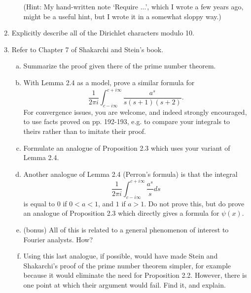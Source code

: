 \documentclass[12pt]{amsart}
\begin{document}
\begin{enumerate}[1.]
\begin{enumerate}[(a)]
(Hint: My hand-written note `Require ...', which I wrote a few years ago, might be a useful hint,
but I wrote it in a somewhat sloppy way.)
\end{enumerate}
\vskip 0.5cm
\item
Explicitly describe all of the Dirichlet characters modulo 10.
\item
\vskip 0.5cm
Refer to Chapter 7 of Shakarchi and Stein's book.
\begin{enumerate}[(a)]
\item
Summarize the proof given there of the prime number theorem.
\item
With Lemma 2.4 as a model, prove a similar formula for
\[
\frac{1}{2 \pi i} \int_{c - i \infty}^{c + i \infty} \frac{a^s}{s(s + 1)(s + 2)}.
\]
For convergence issues, you are welcome, and indeed strongly encouraged, to use facts proved 
on pp. 192-193, e.g. to compare your integrals to theirs rather than to imitate their proof.
\item
Formulate an analogue of Proposition 2.3 which uses your variant of Lemma 2.4.
\item
Another analogue of Lemma 2.4 (Perron's formula) is that the integral
\[
\frac{1}{2 \pi i} \int_{c - i \infty}^{c + i \infty} \frac{a^s}{s} ds
\]
is equal to $0$ if $0 < a < 1$, and $1$ if $a > 1$. Do not prove this, but do prove
an analogue of Proposition 2.3 which directly gives a formula for $\psi(x)$.
\item
(bonus) All of this is related to a general phenomenon of interest to Fourier analysts.
How?
\item
Using this last analogue, if possible, would have made Stein and Shakarchi's 
proof of the prime number theorem
simpler, for example because it would eliminate the need for Proposition 2.2. However, there
is one point at which their argument would fail. Find it, and explain.
\end{enumerate}
\end{enumerate}
\end{document}
